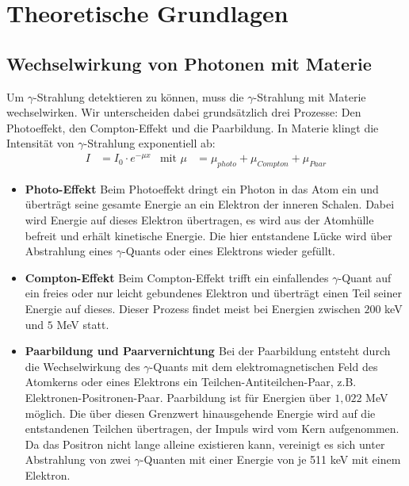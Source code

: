 \section{Theoretische Grundlagen}
\cite{anleitung}
\subsection{Wechselwirkung von Photonen mit Materie}

Um $\gamma$-Strahlung detektieren zu können, muss die $\gamma$-Strahlung mit Materie wechselwirken. Wir unterscheiden dabei grundsätzlich drei Prozesse: Den Photoeffekt, den Compton-Effekt und die Paarbildung. In Materie klingt die Intensität von $\gamma$-Strahlung exponentiell ab:
\begin{align}
I&= I_0\cdot e^{-\mu x}
&\text{mit } 
\mu &= \mu_{photo} + \mu_{Compton} + \mu_{Paar}
\end{align}



\begin{itemize}
\item \textbf{Photo-Effekt}
Beim Photoeffekt dringt ein Photon in das Atom ein und überträgt seine gesamte Energie an ein Elektron der inneren Schalen. Dabei wird Energie auf dieses Elektron übertragen, es wird aus der Atomhülle befreit und erhält kinetische Energie. Die hier entstandene Lücke wird über Abstrahlung eines $\gamma$-Quants oder eines Elektrons wieder gefüllt.

\item\textbf{Compton-Effekt}
Beim Compton-Effekt trifft ein einfallendes $\gamma$-Quant auf ein freies oder nur leicht gebundenes Elektron und überträgt einen Teil seiner Energie auf dieses. Dieser Prozess findet meist bei Energien zwischen $200$ keV und $5$ MeV statt.

\item\textbf{Paarbildung und Paarvernichtung \label{PVN1}}
Bei der Paarbildung entsteht durch die Wechselwirkung des $\gamma$-Quants mit dem elektromagnetischen Feld des Atomkerns oder eines Elektrons ein Teilchen-Antiteilchen-Paar, z.B. Elektronen-Positronen-Paar. Paarbildung ist für Energien über $1,022$ MeV möglich. Die über diesen Grenzwert hinausgehende Energie wird auf die entstandenen Teilchen übertragen, der Impuls wird vom Kern aufgenommen. Da das Positron nicht lange alleine existieren kann, vereinigt es sich unter Abstrahlung von zwei $\gamma$-Quanten mit einer Energie von je 511 keV mit einem Elektron.
\end{itemize}

